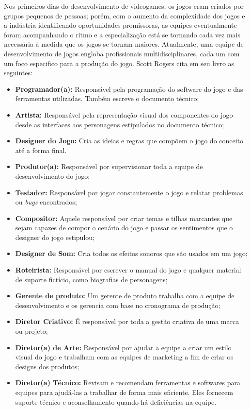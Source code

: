 Nos primeiros dias do desenvolvimento de videogames, os jogos eram criados por grupos pequenos de pessoas; porém, com o aumento da complexidade dos jogos e a indústria identificando oportunidades promissoras, as equipes eventualmente foram acompanhando o ritmo e a especialização está se tornando cada vez mais necessária à medida que os jogos se tornam maiores. Atualmente, uma equipe de desenvolvimento de jogos engloba profissionais multidisciplinares, cada um com um foco especifico para a produção do jogo. Scott Rogers cita em seu livro \cite{GameDesign} as seguintes: 
\begin{itemize}
    \item \textbf{Programador(a):} Responsável pela programação do software do jogo e das ferramentas utilizadas. Também escreve o documento técnico;
    \item \textbf{Artista:} Responsável pela representação visual dos componentes do jogo desde as interfaces aos personagens estipulados no documento técnico;
    \item \textbf{Designer do Jogo:} Cria as ideias e regras que compõem o jogo do conceito até a forma final.
    \item \textbf{Produtor(a): }Responsável por supervisionar toda a equipe de desenvolvimento do jogo;
    \item \textbf{Testador:} Responsável por jogar constantemente o jogo e relatar problemas ou \textit{bugs} encontrados;
    \item \textbf{Compositor:} Aquele responsável por criar temas e tilhas marcantes que sejam capazes de compor o cenário do jogo e passar os sentimentos que o designer do jogo estipulou;
    \item \textbf{Designer de Som:} Cria todos os efeitos sonoros que são usados em um jogo;
    \item \textbf{Roteirista:}  Responsável por escrever o manual do jogo e qualquer material de suporte fictício, como  biografias de personagens;
    \item \textbf{Gerente de produto:} Um gerente de produto trabalha com a equipe de desenvolvimento e os gerencia com base no cronograma de produção;
    \item \textbf{Diretor Criativo:} É responsável por toda a gestão criativa de uma marca ou projeto;
    \item \textbf{Diretor(a) de Arte:} Responsável por ajudar a equipe a criar um estilo visual do jogo e trabalham com as equipes de marketing a fim de criar os designs dos produtos;
    \item \textbf{Diretor(a) Técnico:} Revisam e recomendam ferramentas e softwares para equipes para ajudá-las a trabalhar de forma mais eficiente. Eles fornecem suporte técnico e aconselhamento quando há deficiências na equipe.
\end{itemize}

